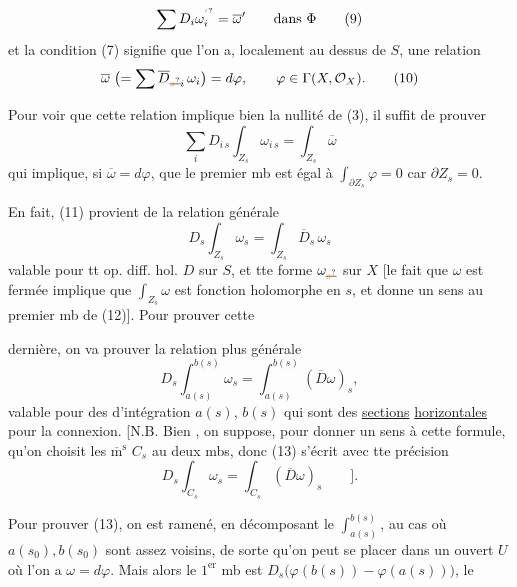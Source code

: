 \[
 \sum D_i\omega^{\unsure{'}}_i=\overline\omega'\qquad\text{dans }\Phi
 \tag*{(9)}
\]
et la condition (7) signifie que l'on a, localement au dessus de $S$, une relation
\[
 \overline\omega\; \bigl(=\sum\overline D_{\deleted{\unsure{s}}i}\,\omega_i\bigr)=d\varphi,\qquad
 \varphi\in\Gamma(X,\mathcal O_X).\tag*{(10)}
\]

Pour voir que cette relation implique bien la nullité de (3), il suffit de prouver
\[
 \sum_i D_{i\,s}\int_{Z_s}\omega_{i\,s}=\int_{Z_s}\overline\omega
 \tag*{(11)}
\]
qui implique, si $\overline\omega=d\varphi$, que le premier mb est égal à $\int_{\partial Z_s}\varphi=0$ car $\partial Z_s=0$.

En fait, (11) provient de la relation générale
\[
 D_s\int_{Z_s}\omega_s=\int_{Z_s}\overline D_s\,\omega_s
 \tag*{(12)}
\]
valable pour tt op. diff. hol. $D$ sur $S$, et tte forme  $\omega_{\deleted{\unsure{s}}}$ sur $X$ [le fait que $\omega$ est fermée implique que $\int_{Z_s}\omega$ est fonction holomorphe en $s$, et donne un sens au premier mb de (12)]. Pour prouver cette

dernière, on  va prouver la relation plus générale
\[
 D_s\int_{a(s)}^{b(s)}\omega_s=\int_{a(s)}^{b(s)}(\overline D\omega)_s,
 \tag*{(13)}
\]
valable pour des  d'intégration $a(s)$, $b(s)$ qui sont des \uline{sections} \uline{horizontales} pour la connexion. [N.B. Bien , on suppose, pour donner un sens à cette formule, qu'on choisit les $\overline{\mathrm m}^{\mathrm s}$ $C_s$ au deux mbs, donc (13) s'écrit avec tte précision
\[
 D_s\int_{C_s}\omega_s=\int_{C_s}(\overline D\omega)_s\qquad].
 \tag*{(13 bis)}
\]

Pour prouver (13), on est ramené, en  décomposant le  $\int_{a(s)}^{b(s)}$, au cas où $a(s_0),b(s_0)$ sont assez voisins, de sorte qu'on peut se placer dans un ouvert $U$ où l'on a $\omega=d\varphi$. Mais alors le $1^{\mathrm{er}}$ mb est $D_s\bigl(\varphi(b(s))-\varphi(a(s))\bigr)$, le

